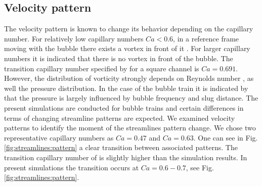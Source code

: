 \documentclass{article}
\begin{document}
\subsection{Velocity pattern}
\label{sec:velocity}
The velocity pattern is known to change its behavior depending on the capillary number. For
relatively low capillary numbers $Ca<0.6$, in a reference frame moving with the bubble there
exists a vortex 
in front of it \cite{heil-threedim}. For larger capillary numbers it is indicated that there is no
vortex in front of the bubble. The transition capillary number specified by
\citet{heil-threedim} for a square channel is $Ca=0.691$. However, the
distribution of vorticity strongly depends on Reynolds number \cite{heil-bretherton}, as well the
pressure distribution. In the case of the bubble train it is indicated by \citet{kreutzer-taylor}
that the pressure is largely influenced by bubble frequency and slug distance. The present
simulations are conducted for bubble trains and certain differences in terms of changing streamline
patterns are expected. We examined velocity patterns to identify the moment of the streamlines
pattern change. We chose two
representative capillary numbers as $Ca=0.47$ and $Ca=0.63$. 
One can
see in Fig. \ref{fig:streamlines:pattern} a clear transition between associated patterns. The
transition capillary number of
\citet{heil-threedim} is slightly higher than the simulation results. In present simulations the
transition occurs at $Ca=0.6-0.7$, see Fig. \ref{fig:streamlines:pattern}.
\end{document}
